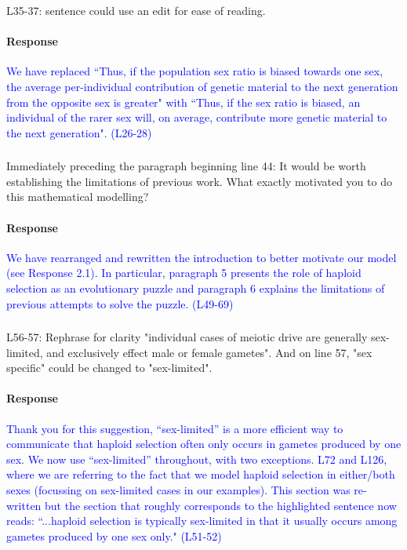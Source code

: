 \documentclass[10pt,letterpaper]{article}
\begin{document}
\noindent\subsubsection{}
L35-37: sentence could use an edit for ease of reading.

\noindent\paragraph{Response}
\textcolor{blue}{We have replaced ``Thus, if the population sex ratio is biased towards one sex, the average per-individual contribution of genetic material to the next generation from the opposite sex is greater" with ``Thus, if the sex ratio is biased, an individual of the rarer sex will, on average, contribute more genetic material to the next generation". (L26-28)}

\noindent\subsubsection{}
Immediately preceding the paragraph beginning line 44: It would be worth establishing the limitations of previous work. What exactly motivated you to do this mathematical modelling?

\noindent\paragraph{Response}
\textcolor{blue}{We have rearranged and rewritten the introduction to better motivate our model (see Response 2.1). In particular, paragraph 5 presents the role of haploid selection as an evolutionary puzzle and paragraph 6 explains the limitations of previous attempts to solve the puzzle. (L49-69)}

\noindent\subsubsection{}
L56-57: Rephrase for clarity "individual cases of meiotic drive are generally sex-limited, and exclusively effect male or female gametes". And on line 57, "sex specific" could be changed to "sex-limited".

\noindent\paragraph{Response}
\textcolor{blue}{
Thank you for this suggestion, ``sex-limited'' is a more efficient way to communicate that haploid selection often only occurs in gametes produced by one sex. 
We now use ``sex-limited'' throughout, with two exceptions. L72 and L126, where we are referring to the fact that we model haploid selection in either/both sexes (focussing on sex-limited cases in our examples). 
This section was re-written but the section that roughly corresponds to the highlighted sentence now reads: ``...haploid selection is typically sex-limited in that it usually occurs among gametes produced by one sex only." (L51-52) 
}
\end{document}
